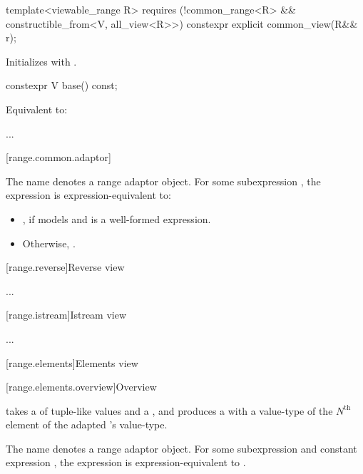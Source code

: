 \documentclass{wg21}
\begin{document}
%
\begin{itemdecl}
template<viewable_range R>
requires (!common_range<R> && constructible_from<V, all_view<R>>)
constexpr explicit common_view(R&& r);
\end{itemdecl}

\begin{itemdescr}
\pnum
\effects Initializes  with .
\end{itemdescr}

%
\begin{itemdecl}
constexpr V base() const;
\end{itemdecl}

\begin{itemdescr}
\pnum
\effects Equivalent to: 
\end{itemdescr}

...

[range.common.adaptor]{}

\pnum
The name  denotes a
range adaptor object.
For some subexpression ,
the expression  is expression-equivalent to:

\begin{itemize}
\item {},
if  models 
and  is a well-formed expression.

\item Otherwise, .
\end{itemize}

[range.reverse]{Reverse view}

...

[range.istream]{Istream view}

...

[range.elements]{Elements view}

[range.elements.overview]{Overview}

\pnum
{} takes
a  of tuple-like values and a , and
produces a  with a value-type of the $N^\text{th}$ element
of the adapted 's value-type.

\pnum
The name  denotes
a range adaptor object.
For some subexpression  and constant expression ,
the expression  is expression-equivalent to
.
\end{document}
